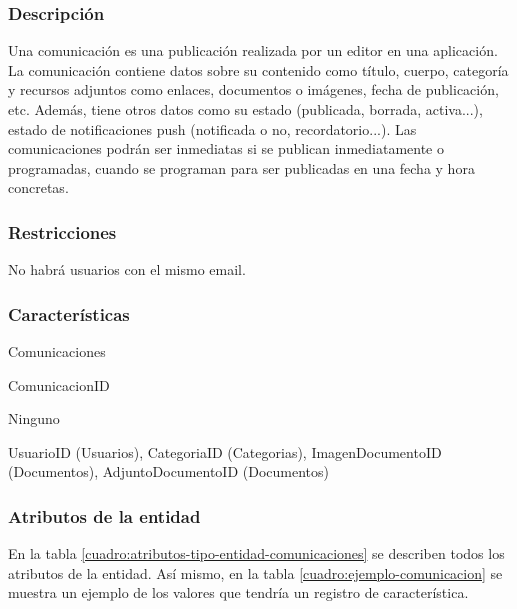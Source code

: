 \subsubsection*{Descripción}
Una comunicación es una publicación realizada por un editor en una aplicación. La comunicación contiene datos sobre su contenido como título, cuerpo, categoría y recursos adjuntos como enlaces, documentos o imágenes, fecha de publicación, etc. Además, tiene otros datos como su estado (publicada, borrada, activa...), estado de notificaciones push (notificada o no, recordatorio...). Las comunicaciones podrán ser inmediatas si se publican inmediatamente o programadas, cuando se programan para ser publicadas en una fecha y hora concretas.

\subsubsection*{Restricciones}
No habrá usuarios con el mismo email.

\subsubsection*{Características}
\begin{description}[nosep,style=multiline,labelindent=0.8cm,leftmargin=4.5cm,font=\normalfont]
    \item[Nombre] Comunicaciones
    \item[Id. principal] ComunicacionID
    \item[Id. alternativo] Ninguno
    \item[Atrib. heredados] UsuarioID (Usuarios), CategoriaID (Categorias), ImagenDocu\linebreak mentoID (Documentos), AdjuntoDocumentoID (Documentos)
\end{description}

\subsubsection*{Atributos de la entidad}
En la tabla \ref{cuadro:atributos-tipo-entidad-comunicaciones} se describen todos los atributos de la entidad. Así mismo, en la tabla \ref{cuadro:ejemplo-comunicacion} se muestra un ejemplo de los valores que tendría un registro de característica.


